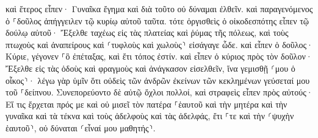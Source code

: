 \documentclass{openreader}
\begin{document}
καὶ ἕτερος εἶπεν· Γυναῖκα ἔγημα καὶ διὰ τοῦτο οὐ δύναμαι ἐλθεῖν. 
καὶ παραγενόμενος ὁ ⸀δοῦλος ἀπήγγειλεν τῷ κυρίῳ αὐτοῦ ταῦτα. τότε ὀργισθεὶς ὁ οἰκοδεσπότης εἶπεν τῷ δούλῳ αὐτοῦ· Ἔξελθε ταχέως εἰς τὰς πλατείας καὶ ῥύμας τῆς πόλεως, καὶ τοὺς πτωχοὺς καὶ ἀναπείρους καὶ ⸂τυφλοὺς καὶ χωλοὺς⸃ εἰσάγαγε ὧδε. 
καὶ εἶπεν ὁ δοῦλος· Κύριε, γέγονεν ⸀ὃ ἐπέταξας, καὶ ἔτι τόπος ἐστίν. 
καὶ εἶπεν ὁ κύριος πρὸς τὸν δοῦλον· Ἔξελθε εἰς τὰς ὁδοὺς καὶ φραγμοὺς καὶ ἀνάγκασον εἰσελθεῖν, ἵνα γεμισθῇ ⸂μου ὁ οἶκος⸃· 
λέγω γὰρ ὑμῖν ὅτι οὐδεὶς τῶν ἀνδρῶν ἐκείνων τῶν κεκλημένων γεύσεταί μου τοῦ ⸀δείπνου. 
Συνεπορεύοντο δὲ αὐτῷ ὄχλοι πολλοί, καὶ στραφεὶς εἶπεν πρὸς αὐτούς· 
Εἴ τις ἔρχεται πρός με καὶ οὐ μισεῖ τὸν πατέρα ⸀ἑαυτοῦ καὶ τὴν μητέρα καὶ τὴν γυναῖκα καὶ τὰ τέκνα καὶ τοὺς ἀδελφοὺς καὶ τὰς ἀδελφάς, ἔτι ⸀τε καὶ τὴν ⸂ψυχὴν ἑαυτοῦ⸃, οὐ δύναται ⸂εἶναί μου μαθητής⸃. 
\end{document}
